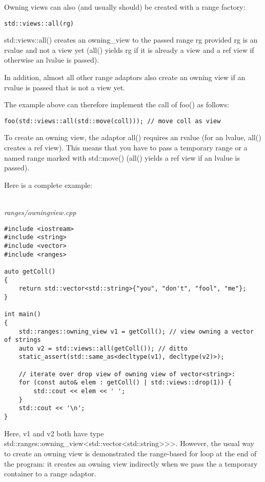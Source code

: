 Owning views can also (and usually should) be created with a range factory:

\begin{lstlisting}[style=styleCXX]
std::views::all(rg)
\end{lstlisting}

std::views::all() creates an owning\_view to the passed range rg provided rg is an rvalue and not a view yet (all() yields rg if it is already a view and a ref view if otherwise an lvalue is passed).

In addition, almost all other range adaptors also create an owning view if an rvalue is passed that is not a view yet.

The example above can therefore implement the call of foo() as follows:

\begin{lstlisting}[style=styleCXX]
foo(std::views::all(std::move(coll))); // move coll as view
\end{lstlisting}

To create an owning view, the adaptor all() requires an rvalue (for an lvalue, all() creates a ref view). This means that you have to pass a temporary range or a named range marked with std::move() (all() yields a ref view if an lvalue is passed).

Here is a complete example:

\noindent
\hspace*{\fill} \\ %
\textit{ranges/owningview.cpp}

\begin{lstlisting}[style=styleCXX]
#include <iostream>
#include <string>
#include <vector>
#include <ranges>

auto getColl()
{
	return std::vector<std::string>{"you", "don't", "fool", "me"};
}

int main()
{
	std::ranges::owning_view v1 = getColl(); // view owning a vector of strings
	auto v2 = std::views::all(getColl()); // ditto
	static_assert(std::same_as<decltype(v1), decltype(v2)>);
	
	// iterate over drop view of owning view of vector<string>:
	for (const auto& elem : getColl() | std::views::drop(1)) {
		std::cout << elem << ' ';
	}
	std::cout << '\n';
}
\end{lstlisting}

Here, v1 and v2 both have type std::ranges::owning\_view<std::vector<std::string>>>. However, the usual way to create an owning view is demonstrated the range-based for loop at the end of the program: it creates an owning view indirectly when we pass the a temporary container to a range adaptor.

